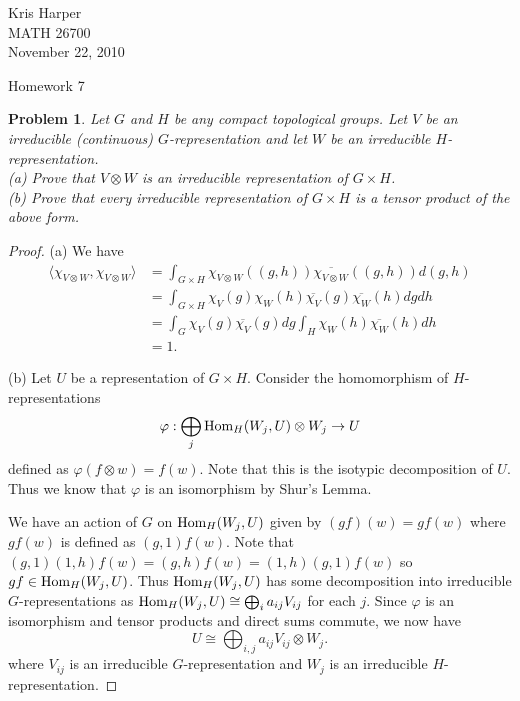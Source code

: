 \documentclass{article}
\renewcommand{\hom}{\textup{Hom}}
\newtheorem{problem}{Problem}
\begin{document}
\begin{flushright}
Kris Harper\\

MATH 26700\\

November 22, 2010
\end{flushright}

\begin{center}
Homework 7
\end{center}

\begin{problem}
Let $G$ and $H$ be any compact topological groups. Let $V$ be an irreducible (continuous) $G$-representation and let $W$ be an irreducible $H$-representation.\\
(a) Prove that $V \otimes W$ is an irreducible representation of $G \times H$.\\
(b) Prove that every irreducible representation of $G \times H$ is a tensor product of the above form.
\end{problem}
\begin{proof}
(a) We have
\begin{align*}
\langle \chi_{V \otimes W}, \chi_{V \otimes W} \rangle
&= \int_{G \times H} \chi_{V \otimes W}((g,h)) \overline{\chi_{V \otimes W}}((g,h)) d(g,h)\\
&= \int_{G \times H} \chi_V(g) \chi_W(h) \overline{\chi_{V}}(g) \overline{\chi_{W}}(h) dg dh\\
&= \int_G \chi_V(g) \overline{\chi_V}(g) dg \int_H \chi_W(h) \overline{\chi_W}(h) dh\\
&= 1.
\end{align*}

(b) Let $U$ be a representation of $G \times H$. Consider the homomorphism of $H$-representations
\[
\varphi : \bigoplus_j \hom_H(W_j, U) \otimes W_j \to U
\]
defined as $\varphi(f \otimes w) = f(w)$. Note that this is the isotypic decomposition of $U$. Thus we know that $\varphi$ is an isomorphism by Shur's Lemma.

We have an action of $G$ on $\hom_H(W_j, U)$ given by $(gf)(w) = gf(w)$ where $gf(w)$ is defined as $(g,1)f(w)$. Note that $(g,1)(1,h)f(w) = (g,h)f(w) = (1,h)(g,1) f(w)$ so $gf \in \hom_H(W_j, U)$. Thus $\hom_H(W_j, U)$ has some decomposition into irreducible $G$-representations as $\hom_H(W_j, U) \cong \bigoplus_i a_{ij} V_{ij}$ for each $j$. Since $\varphi$ is an isomorphism and tensor products and direct sums commute, we now have
\[
U \cong \bigoplus_{i,j} a_{ij} V_{ij} \otimes W_j.
\]
where $V_{ij}$ is an irreducible $G$-representation and $W_j$ is an irreducible $H$-representation.
\end{proof}
\end{document}
